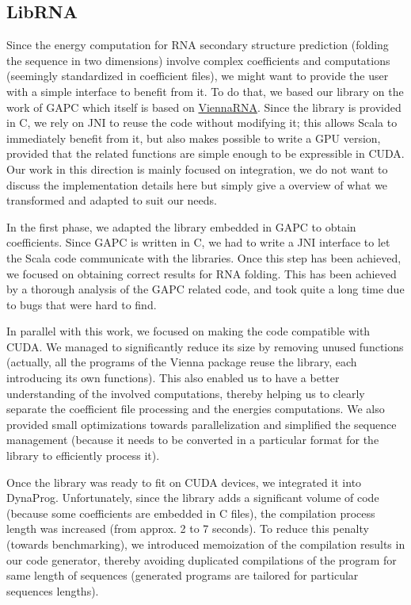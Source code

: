 \newpage
\subsection{LibRNA}
Since the energy computation for RNA secondary structure prediction (folding the sequence in two dimensions) involve complex coefficients and computations (seemingly standardized in coefficient files), we might want to provide the user with a simple interface to benefit from it. To do that, we based our library on the work of GAPC\cite{gapc_thesis} which itself is based on \href{http://www.tbi.univie.ac.at/~ivo/RNA/}{ViennaRNA}\cite{vienna_rna}. Since the library is provided in C, we rely on JNI to reuse the code without modifying it; this allows Scala to immediately benefit from it, but also makes possible to write a GPU version, provided that the related functions are simple enough to be expressible in CUDA. Our work in this direction is mainly focused on integration, we do not want to discuss the implementation details here but simply give a overview of what we transformed and adapted to suit our needs.

In the first phase, we adapted the library embedded in GAPC to obtain coefficients. Since GAPC is written in C, we had to write a JNI interface to let the Scala code communicate with the libraries. Once this step has been achieved, we focused on obtaining correct results for RNA folding. This has been achieved by a thorough analysis of the GAPC related code, and took quite a long time due to bugs that were hard to find.

In parallel with this work, we focused on making the code compatible with CUDA. We managed to significantly reduce its size by removing unused functions (actually, all the programs of the Vienna package reuse the library, each introducing its own functions). This also enabled us to have a better understanding of the involved computations, thereby helping us to clearly separate the coefficient file processing and the energies computations. We also provided small optimizations towards parallelization and simplified the sequence management (because it needs to be converted in a particular format for the library to efficiently process it).

Once the library was ready to fit on CUDA devices, we integrated it into DynaProg. Unfortunately, since the library adds a significant volume of code (because some coefficients are embedded in C files), the compilation process length was increased (from approx. 2 to 7 seconds). To reduce this penalty (towards benchmarking), we introduced memoization of the compilation results in our code generator, thereby avoiding duplicated compilations of the program for same length of sequences (generated programs are tailored for particular sequences lengths).

